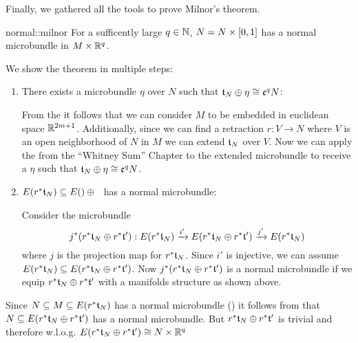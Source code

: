 \begin{scope}
    \newcommand{\rwithney} {
        \whitney{\ind{r}\bt_N}{\ind{r}\bt'}
    }
    \newcommand{\rtn} {
        \ind{r}\bt_N
    }

    \begin{myparagraph}
        Finally, we gathered all the tools to prove Milnor's theorem.
    \end{myparagraph}

    \begin{mytheorem}{normal::milnor}
        For a sufficently large $q \in \N$, $N = \cyldown{N}$ has a normal microbundle in $M \times \R^q$.
    \end{mytheorem}

    \begin{myproof}
        We show the theorem in multiple steps:
        \begin{enumerate}
            \item There exists a microbundle $\eta$ over $N$ such that $\whitney{\bt_N}{\eta} \cong \be[q]{N}$:
            
            From the  it follows that we can consider $M$ to be embedded in euclidean space $\R^{2m + 1}$.
            Additionally, since we can find a retraction $r: V \to N$ where $V$ is an open neighborhood of $N$ in $M$ we can extend $\bt_N$ over $V$.
            Now we can apply the  from the ``Whitney Sum'' Chapter to the extended microbundle
            to receive a $\eta$ such that $\whitney{\bt_N}{\eta} \cong \be[q]{N}$.

            \item $E(\rtn) \sub E(\whitney)$ has a normal microbundle:

            Consider the microbundle
            \[ \bundledef{\ind{j}(\rwithney)}{E(\rtn)}{E(\rwithney)}{i'}{j'} \]
            where $j$ is the projection map for $\rtn$.
            Since $i'$ is injective, we can assume $E(\rtn) \sub E(\rwithney)$.
            Now $\ind{j}(\rwithney)$ is a normal microbundle if we equip $\rwithney$ with a manifolds structure as shown above.
        \end{enumerate}
        Since $N \sub M \sub E(\rtn)$ has a normal microbundle () it follows from  that $N \sub E(\whitney{\ind{r}\bt_N}{\ind{r}\bt'})$ has a normal microbundle.
        But $\whitney{\ind{r}\bt_N}{\ind{r}\bt'}$ is trivial and therefore w.l.o.g. $E(\rwithney) \cong N \times \R^q$
    \end{myproof}
\end{scope}